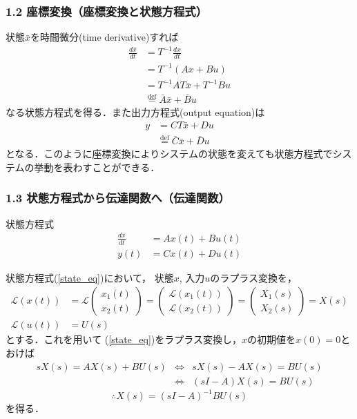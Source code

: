 \documentclass[10pt]{beamer}
\begin{document}
\begin{frame}[t]
\frametitle{1.2 座標変換（座標変換と状態方程式）}
状態$\bar{x}$を時間微分(time derivative)すれば
\begin{align}
 \frac{d \bar{x}}{dt} &= T^{-1} \frac{dx}{dt} \nonumber \\
 &= T^{-1} ( A x + B u) \nonumber \\
 &= T^{-1} A T \bar{x} + T^{-1} B u \nonumber \\
 & \stackrel{\text{def}}{=} \bar{A} \bar{x} + \bar{B} u

\end{align}
なる状態方程式を得る．また出力方程式(output equation)は
\begin{align}
 y &= C T \bar{x} + D u \nonumber \\
   & \stackrel{\text{def}}{=} \bar{C} \bar{x} + \bar{D} u

\end{align}
となる．このように座標変換によりシステムの状態を変えても状態方程式でシス
テムの挙動を表わすことができる．
\end{frame}

\begin{frame}[t]
\frametitle{1.3 状態方程式から伝達関数へ（伝達関数）}
状態方程式
\begin{align}
 \frac{dx}{dt} &= A x(t) + B u(t)  \\
 y(t) &= C x(t) + D u(t) 
\end{align}

状態方程式(\ref{state_eq})において，
状態$x$, 入力$u$のラプラス変換を，
\begin{align}
 {\mathcal L}(x(t)) &=
 {\mathcal L} \left(
        \begin{array}{c}
	 x_1(t) \\
	 x_2(t)
	\end{array}
	\right) =
 \left(
 \begin{array}{c}
  {\mathcal L}(x_1(t)) \\
  {\mathcal L}(x_2(t))
 \end{array}
 \right) =
 \left(
 \begin{array}{c}
  X_1(s) \\
  X_2(s)
 \end{array}
 \right) = X(s) \\
 {\mathcal L}(u(t)) &= U(s)
\end{align}
とする．これを用いて
(\ref{state_eq})をラプラス変換し，$x$の初期値を$x(0) = 0$とおけば
\begin{eqnarray*}
 s X(s) = A X(s) + B U(s) & \Leftrightarrow & s X(s) - A X(s) = B U(s) \\
                          & \Leftrightarrow & (sI - A)X(s) = B U(s)
\end{eqnarray*}
\begin{equation}
 \therefore X(s) = (s I - A)^{-1} B U(s)
\end{equation}
を得る．
\end{frame}
\end{document}
